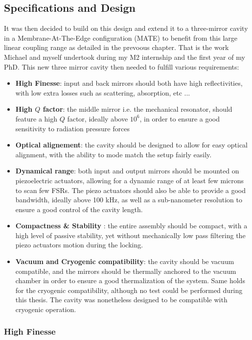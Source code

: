 \subsection{Specifications and Design}
It was then decided to build on this design and extend it to a three-mirror cavity in a Membrane-At-The-Edge configuration (MATE) to benefit from this large linear coupling range as detailed in the prevoous chapter. That is the work Michael and myself undertook during my M2 internship and the first year of my PhD. 
This new three mirror cavity then needed to fulfill various requirements: 
\begin{itemize}
    \item \textbf{High Finesse}: input and back mirrors should both have high reflectivities, with low extra losses such as scattering, absorption, etc ...\cite{AmatoPhD}
    \item \textbf{High $Q$ factor}: the middle mirror i.e. the mechanical resonator, should feature a high $Q$ factor, ideally above $10^6$, in order to ensure a good sensitivity to radiation pressure forces\cite{SiN_review}
    \item \textbf{Optical alignement}: the cavity should be designed to allow for easy optical alignment, with the ability to mode match the setup fairly easily.
    \item \textbf{Dynamical range}: both input and output mirrors should be mounted on piezoelectric actuators, allowing for a dynamic range of at least few microns to scan few FSRs. The piezo actuators should also be able to provide a good bandwidth, ideally above 100 kHz, as well as a sub-nanometer resolution to ensure a good control of the cavity length\cite{piezo_review}.
    \item \textbf{Compactness \& Stability }: the entire assembly should be compact, with a high level of passive stability, yet without mechanically low pass filtering the piezo actuators motion during the locking. 
    \item \textbf{Vacuum and Cryogenic compatibility}: the cavity should be vacuum compatible, and the mirrors should be thermally anchored to the vacuum chamber in order to ensure a good thermalization of the system. Same holds for the cryogenic compatibility, although no test could be performed during this thesis. The cavity was nonetheless designed to be compatible with cryogenic operation.
\end{itemize}
\subsubsection{High Finesse}

